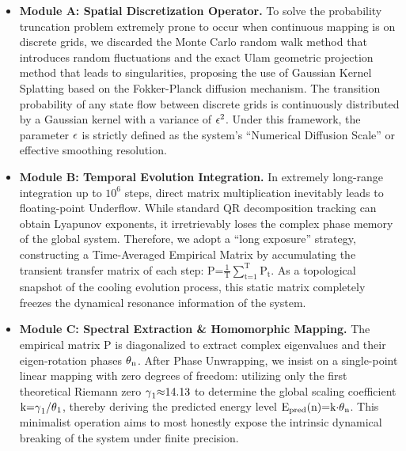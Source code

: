 \documentclass[fractalfract,article,submit,oneauthor,pdftex]{Definitions/mdpi}
\begin{document}
\begin{itemize}
\item
  \textbf{Module A: Spatial Discretization Operator.} To solve the
  probability truncation problem extremely prone to occur when
  continuous mapping is on discrete grids, we discarded the Monte Carlo
  random walk method that introduces random fluctuations and the exact
  Ulam geometric projection method that leads to singularities,
  proposing the use of Gaussian Kernel Splatting based on the
  Fokker-Planck diffusion mechanism. The transition probability of any
  state flow between discrete grids is continuously distributed by a
  Gaussian kernel with a variance of \(\text{\ensuremath{\epsilon}}^{\text{2}}\). Under this
  framework, the parameter \(\text{\ensuremath{\epsilon}}\) is strictly defined as the
  system's ``Numerical Diffusion Scale'' or effective smoothing
  resolution.
\item
  \textbf{Module B: Temporal Evolution Integration.} In extremely
  long-range integration up to \(\text{10}^{\text{6}}\) steps, direct
  matrix multiplication inevitably leads to floating-point Underflow.
  While standard QR decomposition tracking can obtain Lyapunov
  exponents, it irretrievably loses the complex phase memory of the
  global system. Therefore, we adopt a ``long exposure'' strategy,
  constructing a Time-Averaged Empirical Matrix by accumulating the
  transient transfer matrix of each step:
  \(\text{P}\text{=}\frac{\text{1}}{\text{T}}\sum_{\text{t}\text{=1}}^{\text{T}}\text{P}_{\text{t}}\).
  As a topological snapshot of the cooling evolution process, this
  static matrix completely freezes the dynamical resonance information
  of the system.
\item
  \textbf{Module C: Spectral Extraction \& Homomorphic Mapping.} The
  empirical matrix \(\text{P}\) is diagonalized to extract complex
  eigenvalues and their eigen-rotation phases \(\text{\ensuremath{\theta}}_{\text{n}}\).
  After Phase Unwrapping, we insist on a single-point linear mapping
  with zero degrees of freedom: utilizing only the first theoretical
  Riemann zero \(\text{\ensuremath{\gamma}}_{\text{1}}\text{\ensuremath{\approx}14.13}\) to determine the
  global scaling coefficient
  \(\text{k}\text{=}\text{\ensuremath{\gamma}}_{\text{1}}\text{/}\text{\ensuremath{\theta}}_{\text{1}}\),
  thereby deriving the predicted energy level
  \(\text{E}_{\text{pred}}\text{(}\text{n}\text{)=}\text{k}\text{\ensuremath{\cdot}}\text{\ensuremath{\theta}}_{\text{n}}\).
  This minimalist operation aims to most honestly expose the intrinsic
  dynamical breaking of the system under finite precision.
\end{itemize}
\end{document}
